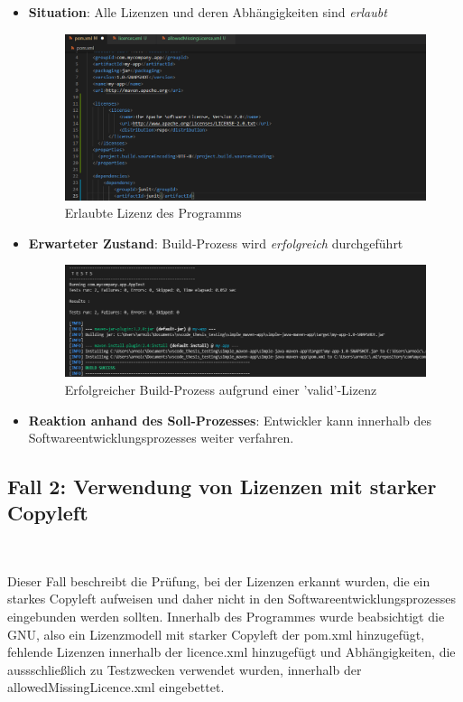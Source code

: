 \begin{itemize}
    \item \textbf{Situation}: Alle Lizenzen und deren Abhängigkeiten sind \textit{erlaubt}
    
    \begin{figure}[h]
        \centering
        \includegraphics[scale=0.5]{Bilder/Fall1Situation.png}
        \caption{Erlaubte Lizenz des Programms}
    \end{figure}

    \item \textbf{Erwarteter Zustand}: Build-Prozess wird \textit{erfolgreich} durchgeführt 
    
    \begin{figure}[h]
        \centering
        \includegraphics[scale=0.5]{Bilder/Fall1Zustand.png}
        \caption{Erfolgreicher Build-Prozess aufgrund einer 'valid'-Lizenz}
    \end{figure}

    \item \textbf{Reaktion anhand des Soll-Prozesses}: Entwickler kann innerhalb des Softwareentwicklungsprozesses weiter verfahren. 
\end{itemize}

\subsection{Fall 2: Verwendung von Lizenzen mit starker Copyleft} $~$

Dieser Fall beschreibt die Prüfung, bei der Lizenzen erkannt wurden, die ein starkes Copyleft aufweisen und daher nicht in den Softwareentwicklungsprozesses eingebunden werden sollten. Innerhalb des Programmes wurde beabsichtigt die GNU, also ein Lizenzmodell mit starker Copyleft der pom.xml hinzugefügt, fehlende Lizenzen innerhalb der licence.xml hinzugefügt und Abhängigkeiten, die aussschließlich zu Testzwecken verwendet wurden, innerhalb der allowedMissingLicence.xml eingebettet. 

